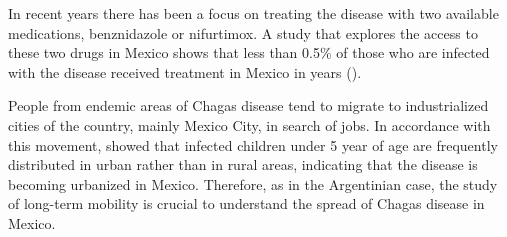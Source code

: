 In recent years there has been a focus on treating the disease with two available
medications, benznidazole or nifurtimox. A study
that explores the access to these two drugs in Mexico
shows that less than 0.5\% of those who are infected with
the disease received treatment in Mexico in years (\cite{manne2013barriers}).


People from endemic areas of Chagas disease tend to migrate to industrialized cities of the country, mainly Mexico City, in search of jobs.
In accordance with this movement, \cite{guzman2001epidemiology} showed
that infected children under 5 year of age are frequently distributed in urban
rather than in rural areas, indicating that the disease is becoming urbanized in
Mexico.
Therefore, as in the Argentinian case, the study of long-term mobility is crucial to understand the spread of Chagas disease in Mexico.






